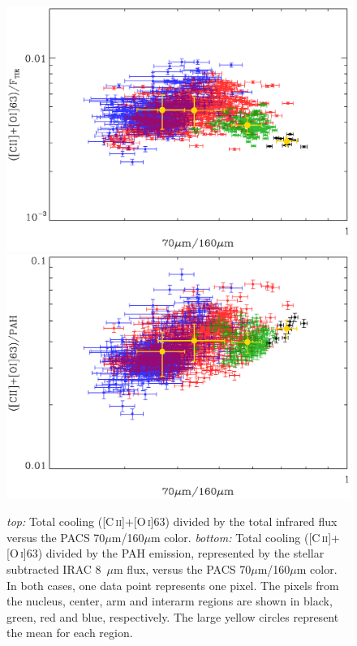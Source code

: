 \documentclass[preprint2]{aastex}
\begin{document}
\begin{figure}
\includegraphics[width=\columnwidth]{Figure4a}
\includegraphics[width=\columnwidth]{Figure4b}
\caption{\emph{top:} Total cooling ([C\,\textsc{ii}]+[O\,\textsc{i}]63) divided by the total infrared flux versus the PACS 70$\mu$m/160$\mu$m color.  \emph{bottom:} Total cooling ([C\,\textsc{ii}]+[O\,\textsc{i}]63) divided by the PAH emission, represented by the stellar subtracted IRAC 8~$\mu$m flux, versus the PACS 70$\mu$m/160$\mu$m color.  In both cases, one data point represents one pixel.  The pixels from the nucleus, center, arm and interarm regions are shown in black, green, red and blue, respectively.  The large yellow circles represent the mean for each region.}
\label{fig:heating_efficiency}
\end{figure}
\end{document}
